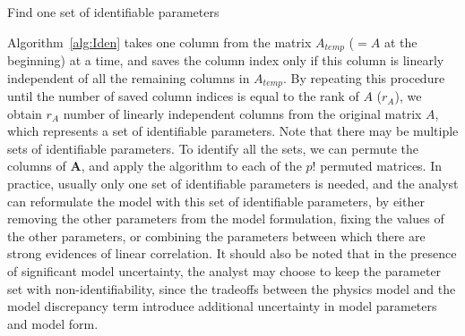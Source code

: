 \documentclass[preprint,review,12pt,3p]{elsarticle}
\begin{document}
\begin{algorithm}                      %
\caption{Find one set of identifiable parameters}          %
\label{alg:Iden}                           %
\end{algorithm}
Algorithm~\ref{alg:Iden} takes one column from the matrix $A_{temp}$ ($=A$ at the beginning) at a time, and saves the column index only if this column is linearly independent of all the remaining columns in $A_{temp}$. By repeating this procedure until the number of saved column indices is equal to the rank of $A$ ($r_A$), we obtain $r_A$ number of linearly independent columns from the original matrix $A$, which represents a set of identifiable parameters. Note that there may be multiple sets of identifiable parameters. To identify all the sets, we can permute the columns of $$, and apply the algorithm to each of the $p!$ permuted matrices. In practice, usually only one set of identifiable parameters is needed, and the analyst can reformulate the model with this set of identifiable parameters, by either removing the other parameters from the model formulation, fixing the values of the other parameters, or combining the parameters between which there are strong evidences of linear correlation. It should also be noted that in the presence of significant model uncertainty, the analyst may choose to keep the parameter set with non-identifiability, since the tradeoffs between the physics model and the model discrepancy term introduce additional uncertainty in model parameters and model form.
\end{document}

